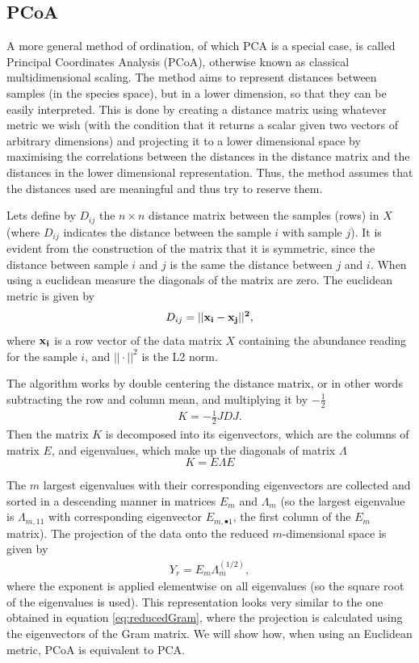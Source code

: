 \subsection{PCoA}
A more general method of ordination, of which PCA is a special case, is called Principal Coordinates Analysis (PCoA), otherwise known as classical multidimensional scaling. The method aims to represent distances between samples (in the species space), but in a lower dimension, so that they can be easily interpreted. This is done by creating a distance matrix using whatever metric we wish (with the condition that it returns a scalar given two vectors of arbitrary dimensions) and projecting it to a lower dimensional space by maximising the correlations between the distances in the distance matrix and the distances in the lower dimensional representation. Thus, the method assumes that the distances used are meaningful and thus try to reserve them.

Lets define by $D_{ij}$ the $n \times n$ distance matrix between the samples (rows) in $X$ (where $D_{ij}$ indicates the distance between the sample $i$ with sample $j$). It is evident from the construction of the matrix that it is symmetric, since the distance between sample $i$ and $j$ is the same the distance between $j$ and $i$. When using a euclidean measure the diagonals of the matrix are zero. The euclidean metric is given by
\begin{align}
D_{ij} = {||\bf{x}_i-\bf{x}_j||^2},
\label{eq:euclideanmetric}
\end{align}
where $\bf{x}_i$ is a row vector of the data matrix $X$ containing the abundance reading for the sample $i$, and $||\cdot||^2$ is the L2 norm.

The algorithm works by double centering the distance matrix, or in other words subtracting the row and column mean, and multiplying it by $-\frac{1}{2}$
\begin{align}
\label{eq:Kmatrix}
K = -\frac{1}{2}JDJ.
\end{align}
Then the matrix $K$ is decomposed into its eigenvectors, which are the columns of matrix $E$, and eigenvalues, which make up the diagonals of matrix $\Lambda$
\begin{equation}
    K = E\Lambda E
\end{equation}

The $m$ largest eigenvalues with their corresponding eigenvectors are collected and sorted in a descending manner in matrices $E_m$ and $\Lambda_m$ (so the largest eigenvalue is $\Lambda_{m,11}$ with corresponding eigenvector $E_{m,{ \bullet}1}$, the first column of the $E_m$ matrix). The projection of the data onto the reduced $m$-dimensional space is given by
\begin{align}
Y_r = E_m \Lambda_m^{(1/2)},
\end{align}
where the exponent is applied elementwise on all eigenvalues (so the square root of the eigenvalues is used). This representation looks very similar to the one obtained in equation \ref{eq:reducedGram}, where the projection is calculated using the eigenvectors of the Gram matrix. We will show how, when using an Euclidean metric, PCoA is equivalent to PCA.

